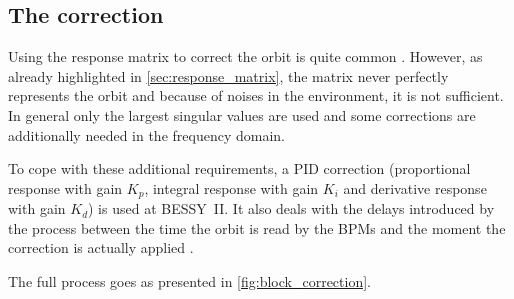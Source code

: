 \subsection{The correction}
\label{sec:correction_sa_corr}
Using the response matrix to correct the orbit is quite common \cite{book:wille,art:plouviez-1999,art:li-2001}. However, as already highlighted in \cref{sec:response_matrix}, the matrix never perfectly represents the orbit and because of noises in the environment, it is not sufficient. In general only the largest singular values are used and some corrections are additionally needed in the frequency domain.

To cope with these additional requirements, a PID correction (proportional response with gain $K_p$, integral response with gain $K_i$ and derivative response with gain $K_d$) is used at BESSY~II. It also deals with the delays introduced by the process between the time the orbit is read by the BPMs and the moment the correction is actually applied \cite{art:plouviez-1999}.

The full process goes as presented in \cref{fig:block_correction}.

